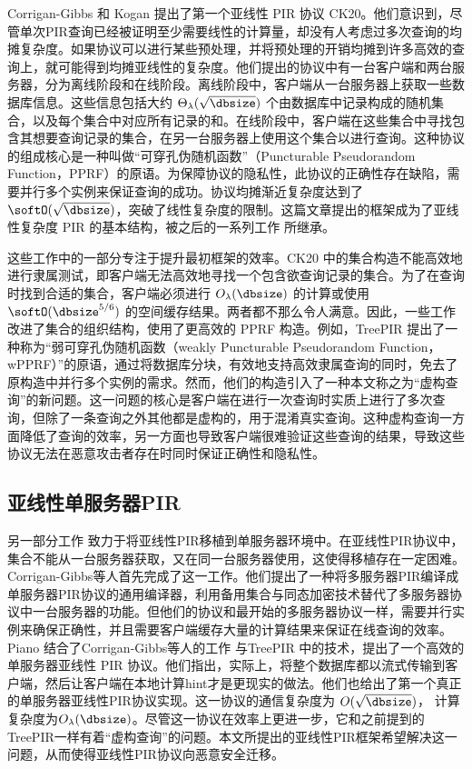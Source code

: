 Corrigan-Gibbs 和 Kogan 提出了第一个亚线性 PIR 协议 CK20\cite{CK20}。他们意识到，尽管单次PIR查询已经被证明至少需要线性的计算量，却没有人考虑过多次查询的均摊复杂度。如果协议可以进行某些预处理，并将预处理的开销均摊到许多高效的查询上，就可能得到均摊亚线性的复杂度。他们提出的协议中有一台客户端和两台服务器，分为离线阶段和在线阶段。离线阶段中，客户端从一台服务器上获取一些数据库信息。这些信息包括大约 $\Theta_\lambda(\sqrt{\dbsize})$ 个由数据库中记录构成的随机集合，以及每个集合中对应所有记录的和。在线阶段中，客户端在这些集合中寻找包含其想要查询记录的集合，在另一台服务器上使用这个集合以进行查询。这种协议的组成核心是一种叫做“可穿孔伪随机函数”（Puncturable Pseudorandom Function，PPRF）的原语。为保障协议的隐私性，此协议的正确性存在缺陷，需要并行多个实例来保证查询的成功。协议均摊渐近复杂度达到了 $\softO(\sqrt{\dbsize})$，突破了线性复杂度的限制。这篇文章提出的框架成为了亚线性复杂度 PIR 的基本结构，被之后的一系列工作 \cite{Piano,MIR23,CHK22,Checklist,TreePIR} 所继承。

这些工作中的一部分专注于提升最初框架的效率。CK20\cite{CK20} 中的集合构造不能高效地进行隶属测试，即客户端无法高效地寻找一个包含欲查询记录的集合。为了在查询时找到合适的集合，客户端必须进行 $O_\lambda(\dbsize)$ 的计算或使用 $\softO(\dbsize^{5/6})$ 的空间缓存结果。两者都不那么令人满意。因此，一些工作\cite{TreePIR,C:SACM21}改进了集合的组织结构，使用了更高效的 PPRF 构造。例如，TreePIR\cite{TreePIR} 提出了一种称为“弱可穿孔伪随机函数（weakly Puncturable Pseudorandom Function，wPPRF）”的原语，通过将数据库分块，有效地支持高效隶属查询的同时，免去了原构造中并行多个实例的需求。然而，他们的构造引入了一种本文称之为“虚构查询”的新问题。这一问题的核心是客户端在进行一次查询时实质上进行了多次查询，但除了一条查询之外其他都是虚构的，用于混淆真实查询。这种虚构查询一方面降低了查询的效率，另一方面也导致客户端很难验证这些查询的结果，导致这些协议无法在恶意攻击者存在时同时保证正确性和隐私性。

\subsection{亚线性单服务器PIR}
另一部分工作 \cite{Piano,CHK22} 致力于将亚线性PIR移植到单服务器环境中。在亚线性PIR协议中，集合不能从一台服务器获取，又在同一台服务器使用，这使得移植存在一定困难。Corrigan-Gibbs等人首先完成了这一工作\cite{CHK22}。他们提出了一种将多服务器PIR编译成单服务器PIR协议的通用编译器，利用备用集合与同态加密技术替代了多服务器协议中一台服务器的功能。但他们的协议和最开始的多服务器协议一样，需要并行实例来确保正确性，并且需要客户端缓存大量的计算结果来保证在线查询的效率。Piano \cite{Piano} 结合了Corrigan-Gibbs等人的工作\cite{CHK22} 与TreePIR \cite{TreePIR} 中的技术，提出了一个高效的单服务器亚线性 PIR 协议。他们指出，实际上，将整个数据库都以流式传输到客户端，然后让客户端在本地计算hint才是更现实的做法。他们也给出了第一个真正的单服务器亚线性PIR协议实现。这一协议的通信复杂度为 $O(\sqrt{\dbsize})$， 计算复杂度为$O_\lambda(\dbsize)$。尽管这一协议在效率上更进一步，它和之前提到的TreePIR一样有着“虚构查询”的问题。本文所提出的亚线性PIR框架希望解决这一问题，从而使得亚线性PIR协议向恶意安全迁移。


